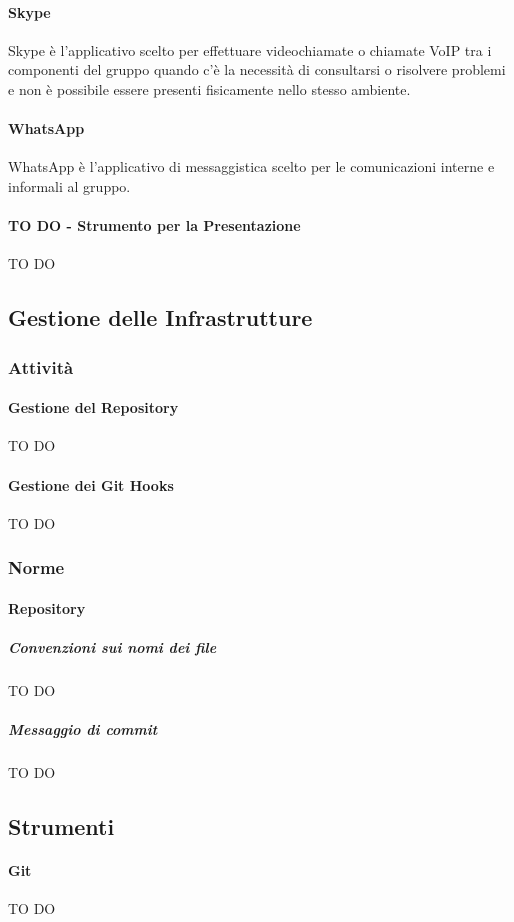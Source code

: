 			\paragraph{Skype}
Skype è l'applicativo scelto per effettuare videochiamate o chiamate VoIP tra i componenti del gruppo quando c'è la necessità di consultarsi o risolvere problemi e non è possibile essere presenti fisicamente nello stesso ambiente.		
			\paragraph{WhatsApp}
WhatsApp è l'applicativo di messaggistica scelto per le comunicazioni interne e informali al gruppo.
			\paragraph{TO DO - Strumento per la Presentazione}
TO DO

	\subsection{Gestione delle Infrastrutture}
		\subsubsection{Attività}
			\paragraph{Gestione del Repository}
TO DO		
			\paragraph{Gestione dei Git Hooks}
TO DO
		\subsubsection{Norme}
			\paragraph{Repository}
				\subparagraph{Convenzioni sui nomi dei file}
TO DO		
				\subparagraph{Messaggio di commit}
TO DO		
			
		\subsection{Strumenti}
			\paragraph{Git}
TO DO	
